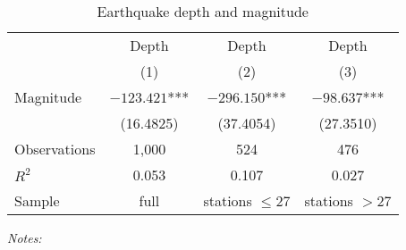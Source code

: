 \begin{table}[!htb]
\begin{adjustbox}{max width=\textwidth, max height=\textheight, center}
\begin{threeparttable}
\centering
\caption{Earthquake depth and magnitude}
\begin{tabular}{lccc}
\toprule
 & Depth & Depth & Depth \\
 & (1) & (2) & (3) \\
\midrule
Magnitude & $-123.421$*** & $-296.150$*** & $-98.637$*** \\
 & (16.4825) & (37.4054) & (27.3510) \\[0.5em]
\midrule
Observations & 1,000 & 524 & 476 \\
$R^2$ & 0.053 & 0.107 & 0.027 \\
Sample & full & stations $\leq 27$ & stations $> 27$ \\
\bottomrule
\end{tabular}
\label{tab:quakes}
\begin{tablenotes}
\item {\em Notes:}
\end{tablenotes}
\end{threeparttable}
\end{adjustbox}
\end{table}
